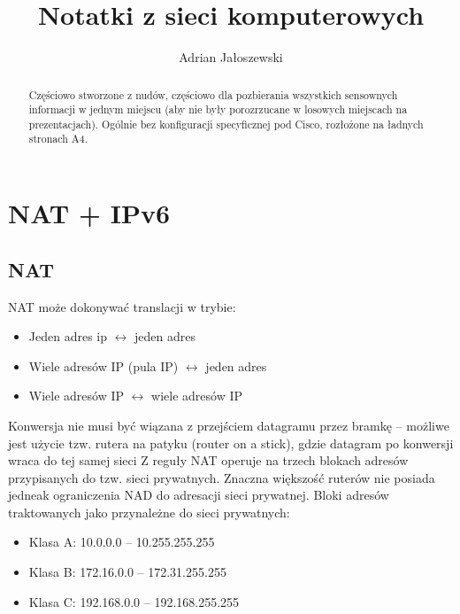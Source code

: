 \documentclass[a4paper, 12pt, titlepage]{article}
\title{Notatki z sieci komputerowych}
\author{Adrian Jałoszewski}
\date{}
\begin{document}
	\maketitle
	\begin{abstract}
		Częściowo stworzone z nudów, częściowo dla pozbierania wszystkich sensownych informacji w jednym miejscu (aby nie były porozrzucane w losowych miejscach na prezentacjach). Ogólnie bez konfiguracji specyficznej pod Cisco, rozłożone na ładnych stronach A4.
	\end{abstract}
	\tableofcontents
	\newpage
	\section{NAT + IPv6}
		\subsection{NAT}
			NAT może dokonywać translacji w trybie:
			\begin{itemize}
				\item Jeden adres ip $\leftrightarrow$ jeden adres
				\item Wiele adresów IP (pula IP) $\leftrightarrow$ jeden adres
				\item Wiele adresów IP $\leftrightarrow$ wiele adresów IP
			\end{itemize}
			Konwersja nie musi być wiązana z przejściem datagramu przez bramkę -- możliwe jest użycie tzw. rutera na patyku (router on a stick), gdzie datagram po konwersji wraca do tej samej sieci
			\newline 
			\newline 
			Z reguły NAT operuje na trzech blokach adresów przypisanych do tzw. sieci prywatnych. Znaczna większość ruterów nie posiada jedneak ograniczenia NAD do adresacji sieci prywatnej. Bloki adresów traktowanych jako przynależne do sieci prywatnych:
			\begin{itemize}
				\item Klasa A: 10.0.0.0 -- 10.255.255.255
				\item Klasa B: 172.16.0.0 -- 172.31.255.255
				\item Klasa C: 192.168.0.0 -- 192.168.255.255
			\end{itemize}
\end{document}
